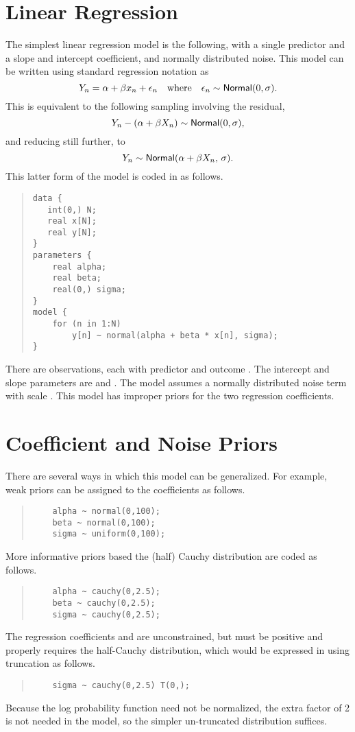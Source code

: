 \section{Linear Regression}

The simplest linear regression model is the following, with a single
predictor and a slope and intercept coefficient, and normally
distributed noise.  This model can be written using standard
regression notation as
%
\[
Y_n = \alpha + \beta x_n + \epsilon_n
\ \ \ \mbox{where} \ \ \ 
\epsilon_n \sim \distro{Normal}(0,\sigma).
\]
This is equivalent to the following sampling involving the
residual,
\[
Y_n - (\alpha + \beta X_n) \sim \mbox{\sf Normal}(0,\sigma),
\]
and reducing still further, to
\[
Y_n \sim \mbox{\sf Normal}(\alpha + \beta X_n, \, \sigma).
\]
%
This latter form of the model is coded in \Stan as follows.
%
\begin{quote}
\begin{Verbatim}
data {
   int(0,) N;
   real x[N];
   real y[N];
}
parameters {
    real alpha;
    real beta;
    real(0,) sigma;
}
model {
    for (n in 1:N)
        y[n] ~ normal(alpha + beta * x[n], sigma);
}
\end{Verbatim}
\end{quote}
%
There are  observations, each with predictor  and
outcome \code{y[n]}.  The intercept and slope parameters are
 and .  The model assumes a normally
distributed noise term with scale .  This model has
improper priors for the two regression coefficients.

\section{Coefficient and Noise Priors}

There are several ways in which this model can be generalized.  
For example, weak priors can be assigned to the coefficients as follows.
%
\begin{quote}
\begin{Verbatim}
    alpha ~ normal(0,100);
    beta ~ normal(0,100);
    sigma ~ uniform(0,100);
\end{Verbatim}
\end{quote}
%
More informative priors based the (half) Cauchy distribution are coded
as follows.
%
\begin{quote}
\begin{Verbatim}
    alpha ~ cauchy(0,2.5);
    beta ~ cauchy(0,2.5);
    sigma ~ cauchy(0,2.5);
\end{Verbatim}
\end{quote}
%
The regression coefficients  and  are
unconstrained, but  must be positive and properly
requires the half-Cauchy distribution, which would be expressed in
\Stan using truncation as follows.
%
\begin{quote}
\begin{Verbatim}
    sigma ~ cauchy(0,2.5) T(0,);
\end{Verbatim}
\end{quote}
%
Because the log probability function need not be normalized, the extra
factor of 2 is not needed in the model, so the simpler un-truncated
distribution suffices.

